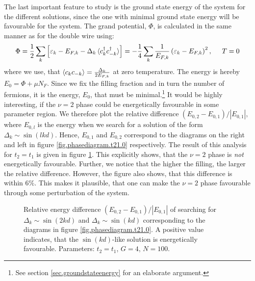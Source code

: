 The last important feature to study is the ground state energy of the system for the different solutions, since the one with minimal ground state energy will be favourable for the system. The grand potential, $\Phi$, is calculated in the same manner as for the double wire using:
\begin{equation}
\Phi = \frac{1}{2}\sum_k \left[\varepsilon_k - E_{F,k} - \Delta_k\braket{c^\dagger_{k}c^\dagger_{-k}}\right] = -\frac{1}{4}\sum_k \frac{1}{E_{F,k}}\left( \varepsilon_k - E_{F,k} \right)^2, \hspace{0.5cm} T = 0
\label{eq.groundstategrandenergy.sumformula}
\end{equation}
where we use, that $\braket{c_kc_{-k}} = \frac{\Delta_k}{2E_{F,k}}$ at zero temperature. The energy is hereby $E_0 = \Phi + \mu N_F$. Since we fix the filling fraction and in turn the number of fermions, it is the energy, $E_0$, that must be minimal.\footnote{See section \ref{sec.groundstateenergy} for an elaborate argument.}  It would be highly interesting, if the $\nu = 2$ phase could be energetically favourable in some parameter region. We therefore plot the relative difference $(E_{0,2} - E_{0,1})/|E_{0,1}|$, where $E_{0,l}$ is the energy when we search for a solution of the form $\Delta_k \sim \sin(lkd)$. Hence, $E_{0,1}$ and $E_{0,2}$ correspond to the diagrams on the right and left in figure \ref{fig.phasediagram.t21.0} respectively. The result of this analysis for $t_2 = t_1$ is given in figure \ref{fig.energydifference.t21.0}. This explicitly shows, that the $\nu = 2$ phase is \textit{not} energetically favourable. Further, we notice that the higher the filling, the larger the relative difference. However, the figure also shows, that this difference is within $6\%$. This makes it plausible, that one can make the $\nu = 2$ phase favourable through some perturbation of the system. 

\begin{figure}
\begin{center}

\caption{Relative energy difference $(E_{0,2} - E_{0,1})/|E_{0,1}|$ of searching for $\Delta_k \sim \sin(2kd)$ and $\Delta_k\sim \sin(kd)$ corresponding to the diagrams in figure \ref{fig.phasediagram.t21.0}. A positive value indicates, that the $\sin(kd)$-like solution is energetically favourable. Parameters: $t_2 = t_1$, $G = 4$, $N = 100$. }
\label{fig.energydifference.t21.0}
\end{center}
\end{figure}

